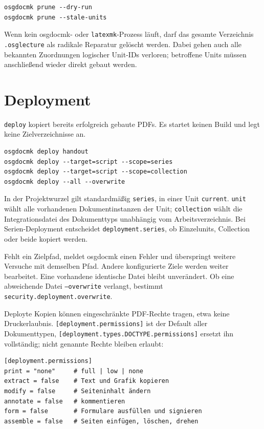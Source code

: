 \documentclass[
load-preamble+
]{osgdoc}
\begin{document}
\begin{verbatim}
osgdocmk prune --dry-run
osgdocmk prune --stale-units
\end{verbatim}

Wenn kein osgdocmk- oder \texttt{latexmk}-Prozess läuft, darf das gesamte
Verzeichnis \texttt{.osglecture} als radikale Reparatur gelöscht werden. Dabei
gehen auch alle bekannten Zuordnungen logischer Unit-IDs verloren; betroffene
Units müssen anschließend wieder direkt gebaut werden.

\section{Deployment}

\texttt{deploy} kopiert bereits erfolgreich gebaute PDFs. Es startet
keinen Build und legt keine Zielverzeichnisse an.

\begin{verbatim}
osgdocmk deploy handout
osgdocmk deploy --target=script --scope=series
osgdocmk deploy --target=script --scope=collection
osgdocmk deploy --all --overwrite
\end{verbatim}

In der Projektwurzel gilt standardmäßig \texttt{series}, in einer Unit
\texttt{current}. \texttt{unit} wählt alle vorhandenen Dokumentinstanzen der Unit;
\texttt{collection} wählt die Integrationsdatei des Dokumenttyps unabhängig
vom Arbeitsverzeichnis. Bei Serien-Deployment entscheidet
\verb|deployment.series|, ob Einzelunits, Collection oder beide kopiert
werden.

Fehlt ein Zielpfad, meldet osgdocmk einen Fehler und überspringt weitere Versuche
mit demselben Pfad. Andere konfigurierte Ziele werden weiter bearbeitet. Eine
vorhandene identische Datei bleibt unverändert. Ob eine abweichende Datei
\texttt{--overwrite} verlangt, bestimmt \verb|security.deployment.overwrite|.

Deployte Kopien können eingeschränkte PDF-Rechte tragen, etwa keine
Druckerlaubnis. \verb|[deployment.permissions]| ist der Default aller
Dokumenttypen, \verb|[deployment.types.DOCTYPE.permissions]| ersetzt ihn
vollständig; nicht genannte Rechte bleiben erlaubt:

\begin{verbatim}
[deployment.permissions]
print = "none"     # full | low | none
extract = false    # Text und Grafik kopieren
modify = false     # Seiteninhalt ändern
annotate = false   # kommentieren
form = false       # Formulare ausfüllen und signieren
assemble = false   # Seiten einfügen, löschen, drehen
\end{verbatim}
\end{document}
